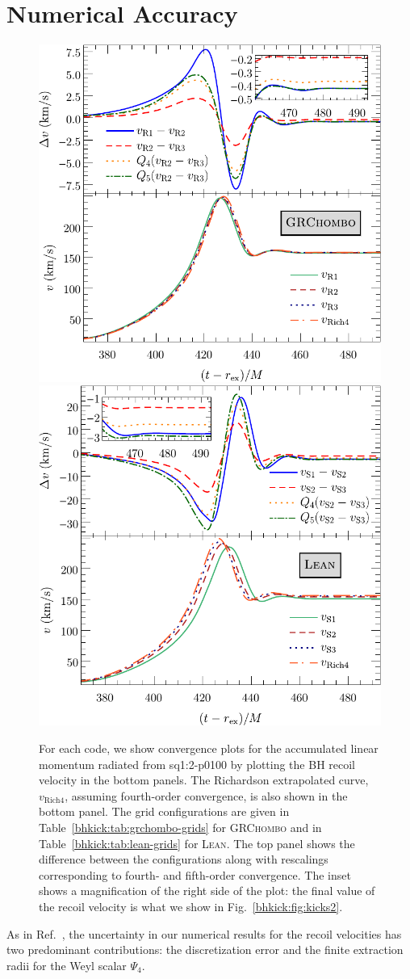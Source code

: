 


\section{Numerical Accuracy}
\label{bhkick:sec:accuracy}
\begin{figure}[t]
    \subfloat%
    {
        \includegraphics[width=0.48\linewidth]{bhkick/grchombo-convergence5.pdf}
    }
    \hfill
    \subfloat%
    {
        \includegraphics[width=0.48\linewidth]{bhkick/lean-convergence4.pdf}
    }
    \caption{For each code, we show convergence plots for the
      accumulated linear momentum radiated from \textsf{sq1:2-p0100}
      by plotting the BH recoil velocity in the bottom panels. The
      Richardson extrapolated curve, $v_{\mathrm{Rich4}}$, assuming
      fourth-order convergence, is also shown in the bottom panel. The
      grid configurations are given in Table~\ref{bhkick:tab:grchombo-grids}
      for \textsc{GRChombo} and in Table~\ref{bhkick:tab:lean-grids} for
      \textsc{Lean}. The top panel shows the difference between the
      configurations along with rescalings corresponding to fourth- and
      fifth-order convergence. The inset shows a magnification of the
      right side of the plot: the final value of the recoil
      velocity is what we show in Fig.~\ref{bhkick:fig:kicks2}.}
    \label{bhkick:fig:convergence}
\end{figure}
As in Ref.~\cite{Sperhake:2019wwo}, the uncertainty in our numerical results
for the recoil velocities has two predominant contributions: the
discretization error and the finite extraction radii for the Weyl scalar
$\Psi_4$.


